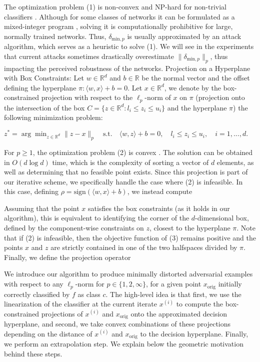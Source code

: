 The optimization problem (1) is non-convex and NP-hard for non-trivial classifiers \cite{katz2017reluplex}. Although for some classes of networks it can be formulated as a mixed-integer program \cite{tjeng2019evaluating}, solving it is computationally prohibitive for large, normally trained networks. Thus, $\delta_{\text{min},p}$ is usually approximated by an attack algorithm, which serves as a heuristic to solve (1). We will see in the experiments that current attacks sometimes drastically overestimate $\|\delta_{\text{min},p}\|_p$, thus impacting the perceived robustness of the networks.
Projection on a Hyperplane with Box Constraints: Let $w \in \mathbb{R}^d$ and $b \in \mathbb{R}$ be the normal vector and the offset defining the hyperplane $\pi : \langle w, x \rangle + b = 0$. Let $x \in \mathbb{R}^d$, we denote by the box-constrained projection with respect to the $\ell_p$-norm of $x$ on $\pi$ (projection onto the intersection of the box $C = \{ z \in \mathbb{R}^d : l_i \leq z_i \leq u_i \}$ and the hyperplane $\pi$) the following minimization problem:

$z^* = \arg \min_{z \in \mathbb{R}^d} \|z - x\|_p \quad \text{s.t.} \quad \langle w, z \rangle + b = 0, \quad l_i \leq z_i \leq u_i, \quad i = 1, ..., d.$

For $p \geq 1$, the optimization problem (2) is convex \cite{hein2017formal}. The solution can be obtained in $O(d \log d)$ time, which is the complexity of sorting a vector of $d$ elements, as well as determining that no feasible point exists. Since this projection is part of our iterative scheme, we specifically handle the case where (2) is infeasible. In this case, defining $\rho = \text{sign}(\langle w, x \rangle + b)$, we instead compute

Assuming that the point $x$ satisfies the box constraints (as it holds in our algorithm), this is equivalent to identifying the corner of the $d$-dimensional box, defined by the component-wise constraints on $z$, closest to the hyperplane $\pi$. Note that if (2) is infeasible, then the objective function of (3) remains positive and the points $x$ and $z$ are strictly contained in one of the two halfspaces divided by $\pi$. Finally, we define the projection operator

We introduce our algorithm to produce minimally distorted adversarial examples with respect to any $\ell_p$-norm for $p \in \{1, 2, \infty\}$, for a given point $x_{\text{orig}}$ initially correctly classified by $f$ as class $c$. The high-level idea is that first, we use the linearization of the classifier at the current iterate $x^{(i)}$ to compute the box-constrained projections of $x^{(i)}$ and $x_{\text{orig}}$ onto the approximated decision hyperplane, and second, we take convex combinations of these projections depending on the distance of $x^{(i)}$ and $x_{\text{orig}}$ to the decision hyperplane. Finally, we perform an extrapolation step. We explain below the geometric motivation behind these steps.

